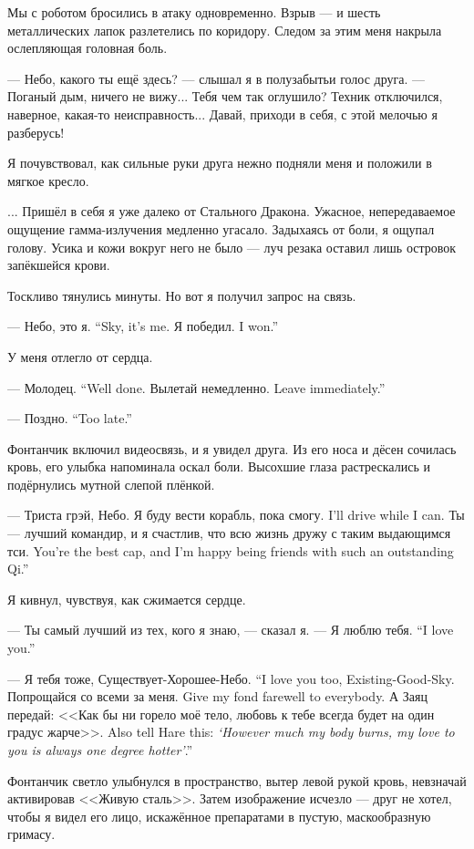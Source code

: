 Мы с роботом бросились в атаку одновременно.
Взрыв --- и шесть металлических лапок разлетелись по коридору.
Следом за этим меня накрыла ослепляющая головная боль.

--- Небо, какого ты ещё здесь? --- слышал я в полузабытьи голос друга.
--- Поганый дым, ничего не вижу...
Тебя чем так оглушило?
Техник отключился, наверное, какая-то неисправность...
Давай, приходи в себя, с этой мелочью я разберусь!

Я почувствовал, как сильные руки друга нежно подняли меня и положили в мягкое кресло.

... Пришёл в себя я уже далеко от Стального Дракона.
Ужасное, непередаваемое ощущение гамма-излучения медленно угасало.
Задыхаясь от боли, я ощупал голову.
Усика и кожи вокруг него не было --- луч резака оставил лишь островок запёкшейся крови.

Тоскливо тянулись минуты.
Но вот я получил запрос на связь.

{--- Небо, это я.}
{``Sky, it's me.}
{Я победил.}
{I won.''}

У меня отлегло от сердца.

{--- Молодец.}
{``Well done.}
{Вылетай немедленно.}
{Leave immediately.''}

{--- Поздно.}
{``Too late.''}

Фонтанчик включил видеосвязь, и я увидел друга.
Из его носа и дёсен сочилась кровь, его улыбка напоминала оскал боли.
Высохшие глаза растрескались и подёрнулись мутной слепой плёнкой.

--- Триста грэй, Небо.
{Я буду вести корабль, пока смогу.}
{I'll drive while I can.}
{Ты --- лучший командир, и я счастлив, что всю жизнь дружу с таким выдающимся тси.}
{You're the best cap, and I'm happy being friends with such an outstanding Qi.''}

Я кивнул, чувствуя, как сжимается сердце.

--- Ты самый лучший из тех, кого я знаю, --- сказал я.
{--- Я люблю тебя.}
{``I love you.''}

{--- Я тебя тоже, Существует-Хорошее-Небо.}
{``I love you too, Existing-Good-Sky.}
{Попрощайся со всеми за меня.}
{Give my fond farewell to everybody.}
{А Заяц передай: <<Как бы ни горело моё тело, любовь к тебе всегда будет на один градус жарче>>.}
{Also tell Hare this: \emph{`However much my body burns, my love to you is always one degree hotter'}.''}

Фонтанчик светло улыбнулся в пространство, вытер левой рукой кровь, невзначай активировав <<Живую сталь>>.
Затем изображение исчезло --- друг не хотел, чтобы я видел его лицо, искажённое препаратами в пустую, маскообразную гримасу.

